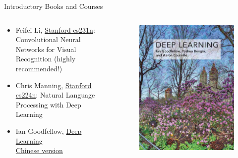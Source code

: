 \documentclass{../TexTemplate/myslide}
\begin{document}
\begin{frame}{Introductory Books and Courses}
\begin{columns}
\begin{column}{0.5\linewidth}
\begin{itemize}
\item Feifei Li, \href{http://cs231n.github.io/}{Stanford cs231n}: Convolutional Neural Networks for Visual Recognition (highly recommended!)
\item Chris Manning, \href{https://web.stanford.edu/class/archive/cs/cs224n/cs224n.1194/}{Stanford cs224n}: Natural Language Processing with Deep Learning
\item Ian Goodfellow, \href{https://www.deeplearningbook.org/}{Deep Learning}\\
\href{https://github.com/exacity/deeplearningbook-chinese}{Chinese version}
\end{itemize}
\end{column}
\begin{column}{0.5\linewidth}
\begin{figure}
\centering
\includegraphics[width=0.8\linewidth]{fig/dl_book.jpeg}
\end{figure}
\end{column}
\end{columns}
\end{frame}
\end{document}

